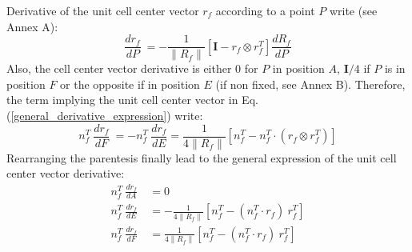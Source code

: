 \documentclass[11pt]{article}
\begin{document}
Derivative of the unit cell center vector $r_f$ according to a point $P$ write (see Annex A):
\begin{equation}
\frac{d r_f}{dP}\ = 
- \frac{1}{\| R_f \|} \left[ \boldsymbol{I} - r_f \otimes r_f^T \right] \frac{d R_f}{dP}
\end{equation}
Also, the cell center vector derivative is either 0 for $P$ in position $A$, $\boldsymbol{I} /4$ if $P$ is in position $F$ or the opposite if in position $E$ (if non fixed, see Annex B). 
Therefore, the term implying the unit cell center vector in Eq. (\ref{general_derivative_expression}) write:
\begin{equation}
n_f^T\ \frac{d r_f}{dF}\ = - n_f^T\ \frac{d r_f}{dE} =
 \frac{1}{4 \| R_f \|} \left[n_f^T- n_f^T \cdot (r_f \otimes r_f^T) \right]
\end{equation}
Rearranging the parentesis finally lead to the general expression of the unit cell center vector derivative:
\begin{subequations}
\begin{align}
n_f^T\ \frac{d r_f}{dA}\ &=  0 \\
n_f^T\ \frac{d r_f}{dE}\ &= - \frac{1}{4 \| R_f \|} \left[ n_f^T - (n_f^T \cdot r_f)\ r_f^T \right] \\
n_f^T\ \frac{d r_f}{dF}\ &=  \frac{1}{4 \| R_f \|} \left[ n_f^T - (n_f^T \cdot r_f)\  r_f^T \right]
\end{align}
\end{subequations} 
\end{document}
